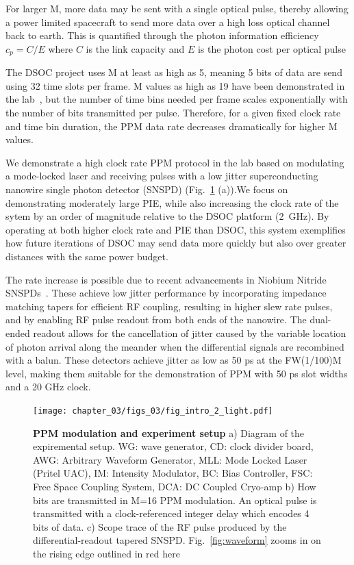 \documentclass[11pt]{caltech_thesis} %
\begin{document}
For larger M, more data may be sent with a single optical pulse, thereby allowing a power limited spacecraft to send more data over a high loss optical channel back to earth. This is quantified through the photon information efficiency $c_p = C/E$ where $C$ is the link capacity and $E$ is the photon cost per optical pulse

The DSOC project uses M at least as high as 5, meaning 5 bits of data are send using 32 time slots per frame. M values as high as 19 have been demonstrated in the lab~\autocite{essiambre2023record}, but the number of time bins needed per frame scales exponentially with the number of bits transmitted per pulse. Therefore, for a given fixed clock rate and time bin duration, the PPM data rate decreases dramatically for higher M values.

We demonstrate a high clock rate PPM protocol in the lab based on modulating a mode-locked laser and receiving pulses with a low jitter superconducting nanowire single photon detector (SNSPD) (Fig.~\ref{fig:intro} (a)).We focus on demonstrating moderately large PIE, while also increasing the clock rate of the sytem by an order of magnitude relative to the DSOC platform (2~GHz). By operating at both higher clock rate and PIE than DSOC, this system exemplifies how future iterations of DSOC may send data more quickly but also over greater distances with the same power budget.

The rate increase is possible due to recent advancements in Niobium Nitride SNSPDs~\autocite{Colangelo2023}. These achieve low jitter performance by incorporating impedance matching tapers for efficient RF coupling, resulting in higher slew rate pulses, and by enabling RF pulse readout from both ends of the nanowire. The dual-ended readout allows for the cancellation of jitter caused by the variable location of photon arrival along the meander when the differential signals are recombined with a balun. These detectors achieve jitter as low as 50 ps at the FW(1/100)M level, making them suitable for the demonstration of PPM with 50 ps slot widths and a 20 GHz clock.

\hypertarget{fig:intro}{%
\begin{figure}
\centering
\texttt{[image: chapter\_03/figs\_03/fig\_intro\_2\_light.pdf]}
\caption[{PPM modulation and experiment setup}]{\textbf{PPM modulation and experiment setup} a) Diagram of the expiremental setup. WG: wave generator, CD: clock divider board, AWG: Arbitrary Waveform Generator, MLL: Mode Locked Laser (Pritel UAC), IM: Intensity Modulator, BC: Bias Controller, FSC: Free Space Coupling System, DCA: DC Coupled Cryo-amp b) How bits are transmitted in M=16 PPM modulation. An optical pulse is transmitted with a clock-referenced integer delay which encodes 4 bits of data. c) Scope trace of the RF pulse produced by the differential-readout tapered SNSPD. Fig.~\ref{fig:waveform} zooms in on the rising edge outlined in red here}
\label{fig:intro}
\end{figure}
}
\end{document}
